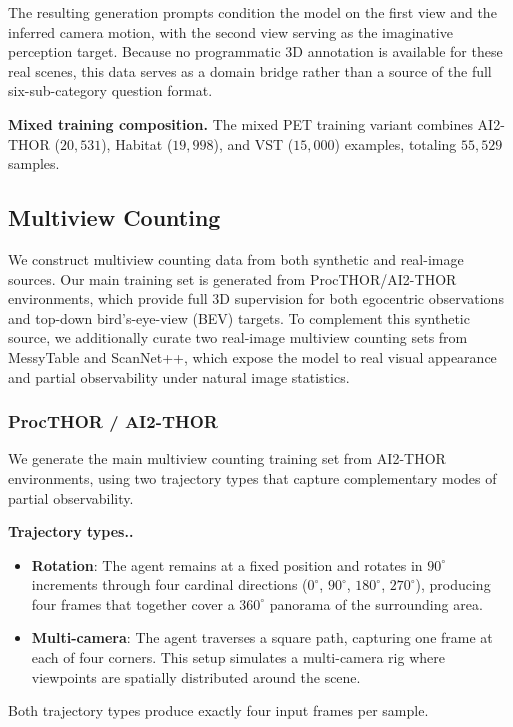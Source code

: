 \documentclass{llmxive}
\providecommand{\paragraph}[1]{\vspace{.5em}\noindent\textbf{#1.}}
\begin{document}
The resulting generation prompts condition the model on the first view and the inferred camera motion, with the second view serving as the imaginative perception target. Because no programmatic 3D annotation is available for these real scenes, this data serves as a domain bridge rather than a source of the full six-sub-category question format.

\noindent\textbf{Mixed training composition.}
The mixed PET training variant combines AI2-THOR ($20{,}531$), Habitat ($19{,}998$), and VST ($15{,}000$) examples, totaling $55{,}529$ samples.

\subsection{Multiview Counting}
\label{supp_data_mvc}

We construct multiview counting data from both synthetic and real-image sources.
Our main training set is generated from ProcTHOR/AI2-THOR environments, which provide full 3D supervision for both egocentric observations and top-down bird's-eye-view (BEV) targets.
To complement this synthetic source, we additionally curate two real-image multiview counting sets from MessyTable and ScanNet++, which expose the model to real visual appearance and partial observability under natural image statistics.

\subsubsection{ProcTHOR / AI2-THOR}

We generate the main multiview counting training set from AI2-THOR environments, using two trajectory types that capture complementary modes of partial observability.

\paragraph{Trajectory types.}
\begin{itemize}
  \item \textbf{Rotation}: The agent remains at a fixed position and rotates in $90^\circ$ increments through four cardinal directions ($0^\circ$, $90^\circ$, $180^\circ$, $270^\circ$), producing four frames that together cover a $360^\circ$ panorama of the surrounding area.
  \item \textbf{Multi-camera}: The agent traverses a square path, capturing one frame at each of four corners. This setup simulates a multi-camera rig where viewpoints are spatially distributed around the scene.
\end{itemize}
Both trajectory types produce exactly four input frames per sample.
\end{document}
